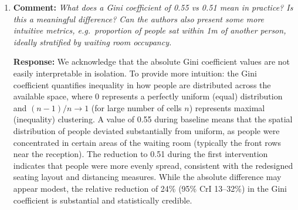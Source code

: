 \documentclass[11pt]{article}
\newcommand{\comment}[1]{\textbf{Comment:} \textit{#1}}
\newcommand{\response}[1]{\textbf{Response:} #1}
\begin{document}
\begin{enumerate}[label=\textbf{R2.\arabic*.}, leftmargin=*]
{\textit{Mtb transmission risk.} For the modelled transmission risk, total daily person-time in the waiting area is included as a model offset, effectively normalising the estimated risk by attendance. This accounts for the fact that, all else being equal, more people in the room likely increases crowding and close-proximity exposure to \emph{Mtb} quanta.

Regarding stratification by occupancy: we agree that it would be informative to assess whether the intervention effect varies with attendance levels, as one might expect the interventions to be more enforceable in a less crowded waiting room. However, a sample size of 52 study days with only 14 days per intervention phase is insufficient to support such a stratified analysis with adequate precision. This limitation is compounded by the sequential design of the study phases and the seasonal decline in attendance, which means that attendance levels are partly confounded with study phase. A study designed to evaluate interaction effects between interventions and attendance would require a larger sample size and greater variation in attendance within each study phase. We have added this as a limitation to the revised manuscript (p.\,\pageref{chg:R2.4}).}

\item\label{r:2.5} \comment{What does a Gini coefficient of 0.55 vs 0.51 mean in practice? Is this a meaningful difference? Can the authors also present some more intuitive metrics, e.g.\ proportion of people sat within 1m of another person, ideally stratified by waiting room occupancy.}

\response{We acknowledge that the absolute Gini coefficient values are not easily interpretable in isolation. To provide more intuition: the Gini coefficient quantifies inequality in how people are distributed across the available space, where 0 represents a perfectly uniform (equal) distribution and $(n-1)/n\rightarrow1$ (for large number of cells $n$) represents maximal (inequality) clustering. A value of 0.55 during baseline means that the spatial distribution of people deviated substantially from uniform, as people were concentrated in certain areas of the waiting room (typically the front rows near the reception). The reduction to 0.51 during the first intervention indicates that people were more evenly spread, consistent with the redesigned seating layout and distancing measures. While the absolute difference may appear modest, the relative reduction of 24\% (95\% CrI 13--32\%) in the Gini coefficient is substantial and statistically credible.

}
\end{enumerate}
\end{document}
